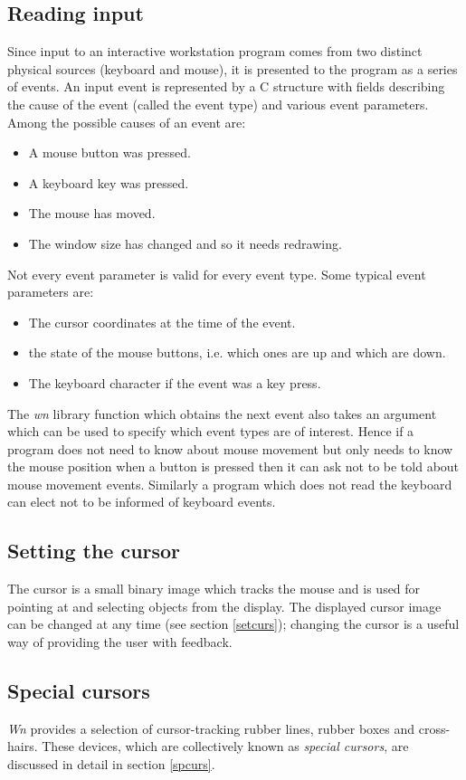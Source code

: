 \subsection{Reading input}
Since input to an interactive workstation program comes from two distinct
physical sources (keyboard and mouse), it is presented to the program
as a series of events. An input event is represented by a C structure
with fields describing the cause of the event (called the event type)
and various event parameters.
Among the possible causes of an event are:
\begin{itemize}
\item A mouse button was pressed.
\item A keyboard key was pressed.
\item The mouse has moved.
\item The window size has changed and so it needs redrawing.
\end{itemize}
Not every event parameter is valid for every event type.
Some typical event parameters are:
\begin{itemize}
\item The cursor coordinates at the time of the event.
\item the state of the mouse buttons, i.e. which ones are up and which are down.
\item The keyboard character if the event was a key press.
\end{itemize}
The {\em wn} library function which obtains the next event also takes
an argument which can be used to specify which event types are of interest.
Hence if a program does not need to know about mouse movement but only
needs to know the mouse position when a button is pressed then it can
ask not to be told about mouse movement events.
Similarly a program which does not read the keyboard can elect not
to be informed of keyboard events.
\subsection{Setting the cursor}
The cursor is a small binary image which tracks the mouse and is
used for pointing at and selecting objects from the display.
The displayed cursor image can be changed at any time (see section \ref{setcurs});
changing the cursor is a useful way of providing the user with feedback.
\subsection{Special cursors}
{\em Wn} provides a selection of cursor-tracking rubber lines, rubber boxes
and cross-hairs. These devices, which are collectively known as {\em special cursors},
are discussed in detail in section \ref{spcurs}.
